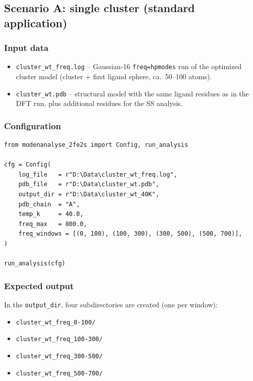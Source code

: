 \documentclass[11pt,a4paper,twoside]{article}
\theoremstyle{remark}
\begin{document}
\subsection{Scenario A: single cluster (standard application)}
\label{sec:workflow-single}

\subsubsection*{Input data}

\begin{itemize}
  \item \texttt{cluster\_wt\_freq.log} -- Gaussian-16
        \texttt{freq=hpmodes} run of the optimized cluster model
        (cluster + first ligand sphere, ca.\ 50--100 atoms).
  \item \texttt{cluster\_wt.pdb} -- structural model with the same
        ligand residues as in the DFT run, plus additional
        residues for the SS analysis.
\end{itemize}

\subsubsection*{Configuration}

\begin{lstlisting}[style=python]
from modenanalyse_2fe2s import Config, run_analysis

cfg = Config(
    log_file   = r"D:\Data\cluster_wt_freq.log",
    pdb_file   = r"D:\Data\cluster_wt.pdb",
    output_dir = r"D:\Data\cluster_wt_40K",
    pdb_chain  = "A",
    temp_k     = 40.0,
    freq_max   = 800.0,
    freq_windows = [(0, 100), (100, 300), (300, 500), (500, 700)],
)

run_analysis(cfg)
\end{lstlisting}

\subsubsection*{Expected output}

In the \texttt{output\_dir}, four subdirectories are created (one
per window):

\begin{itemize}
  \item \texttt{cluster\_wt\_freq\_0-100/}
  \item \texttt{cluster\_wt\_freq\_100-300/}
  \item \texttt{cluster\_wt\_freq\_300-500/}
  \item \texttt{cluster\_wt\_freq\_500-700/}
\end{itemize}
\end{document}
